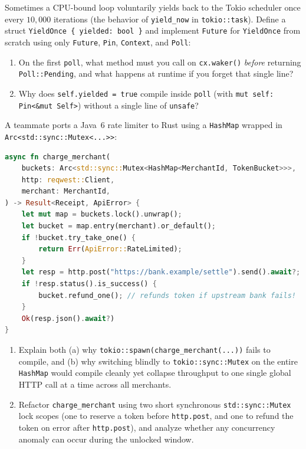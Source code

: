 \begin{exercise}
Sometimes a CPU-bound loop voluntarily yields back to the Tokio scheduler once every $10{,}000$ iterations (the behavior of \texttt{yield\_now} in \texttt{tokio::task}). Define a struct \texttt{YieldOnce \{ yielded: bool \}} and implement \texttt{Future} for \texttt{YieldOnce} from scratch using only \texttt{Future}, \texttt{Pin}, \texttt{Context}, and \texttt{Poll}:
\begin{enumerate}
  \item On the first \texttt{poll}, what method must you call on \texttt{cx.waker()} \emph{before} returning \texttt{Poll::Pending}, and what happens at runtime if you forget that single line?
  \item Why does \texttt{self.yielded = true} compile inside \texttt{poll} (with \texttt{mut self: Pin<\&mut Self>}) without a single line of \texttt{unsafe}?
\end{enumerate}
\end{exercise}

\begin{exercise}
A teammate ports a Java~6 rate limiter to Rust using a \texttt{HashMap} wrapped in \texttt{Arc<std::sync::Mutex<...>>}:
\begin{lstlisting}[language=Rust]
async fn charge_merchant(
    buckets: Arc<std::sync::Mutex<HashMap<MerchantId, TokenBucket>>>,
    http: reqwest::Client,
    merchant: MerchantId,
) -> Result<Receipt, ApiError> {
    let mut map = buckets.lock().unwrap();
    let bucket = map.entry(merchant).or_default();
    if !bucket.try_take_one() {
        return Err(ApiError::RateLimited);
    }
    let resp = http.post("https://bank.example/settle").send().await?;
    if !resp.status().is_success() {
        bucket.refund_one(); // refunds token if upstream bank fails!
    }
    Ok(resp.json().await?)
}
\end{lstlisting}
\begin{enumerate}
  \item Explain both (a) why \texttt{tokio::spawn(charge\_merchant(...))} fails to compile, and (b) why switching blindly to \texttt{tokio::sync::Mutex} on the entire \texttt{HashMap} would compile cleanly yet collapse throughput to one single global HTTP call at a time across all merchants.
  \item Refactor \texttt{charge\_merchant} using two short synchronous \texttt{std::sync::Mutex} lock scopes (one to reserve a token before \texttt{http.post}, and one to refund the token on error after \texttt{http.post}), and analyze whether any concurrency anomaly can occur during the unlocked window.
\end{enumerate}
\end{exercise}

